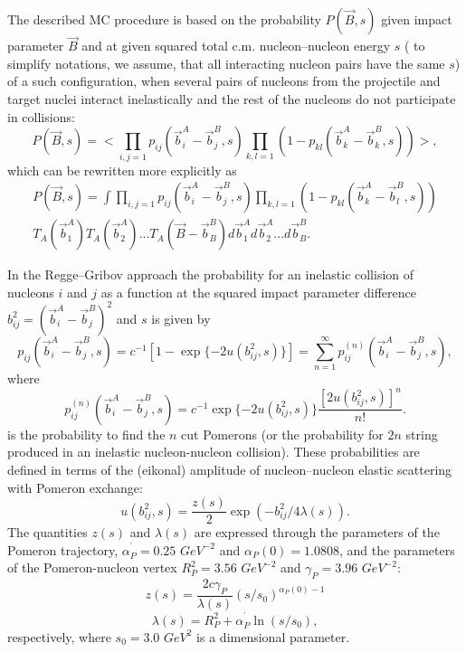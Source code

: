 The described MC procedure is based on the probability
$P(\vec{B},s)$ given impact parameter $\vec{B}$ and at given squared total
c.m. nucleon--nucleon energy $s$ ( to simplify notations, we assume, that
all interacting nucleon pairs have the same $s$) 
of a such configuration, when several pairs of nucleons
from the projectile and target nuclei interact inelastically and the
rest of the nucleons do not participate in collisions:
\begin{equation}
\label{SP1}P(\vec B,s)=<\prod\limits_{i,j=1}p_{ij}(\vec b_i^A-\vec
b_j^B,s)\prod\limits_{k,l=1}(1-p_{kl}(\vec b_k^A-\vec b_k^B,s))>, 
\end{equation}
which can be rewritten
 more explicitly as
\begin{equation}
\label{SP2} 
\begin{array}{c}
P(\vec B,s)=  
\int \prod\limits_{i,j=1}p_{ij}(\vec b_i^A-\vec
b_j^B,s)\prod\limits_{k,l=1}(1-p_{kl}(\vec b_k^A-\vec b_l^B,s))\\ T_A(\vec
b_1^A)T_A(\vec b_2^A)...T_A(\vec B-\vec b_B^B)d\vec b_1^Ad\vec b_2^A...d\vec
b_B^B. 
\end{array}
\end{equation}

In the Regge--Gribov approach\cite{BT76} the probability for an inelastic
collision of nucleons $i$ and $j$ as a function at the squared impact
parameter difference $b_{ij}^2=(\vec{ b}_i^A-\vec{ b}_j^B)^2 $ and $s$
is given by
\begin{equation}
\label{SP3}
 p_{ij}(\vec{ b}_i^A-\vec{ b}_j^B,s)=
 c^{-1}[1-\exp{\{-2u(b_{ij}^2,s)\}}] = 
\sum_{n=1}^{\infty}p^{(n)}_{ij}(\vec{ b}_i^A-\vec{ b}_j^B,s), 
\end{equation}
where
\begin{equation}
\label{SP4}
 p^{(n)}_{ij}(\vec{ b}_i^A-\vec{ b}_j^B,s)
=c^{-1}\exp{\{-2u(b_{ij}^2,s)\}}
 \frac{[2u(b_{ij}^2,s)]^{n}}{n!}.
\end{equation}
is the probability to find the $n$ cut Pomerons (or the probability for
$2n$ string produced in an inelastic nucleon-nucleon collision).  These
probabilities are defined in terms of the (eikonal) amplitude of
nucleon--nucleon elastic scattering with Pomeron exchange:
\begin{equation}
\label{SP5}u(b_{ij}^2,s)=\frac{z(s)}{2}\exp (-b_{ij}^2/4\lambda (s)). 
\end{equation}
The quantities $z(s)$ and $\lambda (s)$ are expressed through the
parameters of the Pomeron trajectory, $\alpha _P^{^{\prime }}=0.25$
$GeV^{-2}$ and $\alpha _P(0)=1.0808$, and the parameters of the
Pomeron-nucleon vertex $R_P^2=3.56$ $GeV^{-2}$ and $\gamma _P=3.96$
$GeV^{-2}$:
\begin{equation}
\label{SP6}z(s)=\frac{2c\gamma _P}{\lambda (s)}(s/s_0)^{\alpha _P(0)-1} 
\end{equation}
\begin{equation}
\label{SP7}\lambda (s)=R_P^2+\alpha _P^{^{\prime }}\ln (s/s_0), 
\end{equation}
respectively, where $s_{0} = 3.0$ $GeV^{2}$ is a dimensional parameter.

